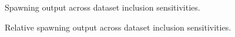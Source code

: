 \documentclass[
]{scrartcl}
\begin{document}
\begin{figure}


\caption{\label{fig-sens_data_spout}Spawning output across dataset
inclusion sensitivities.}

\end{figure}%

\begin{figure}


\caption{\label{fig-sens_data_status}Relative spawning output across
dataset inclusion sensitivities.}

\end{figure}%
\end{document}
